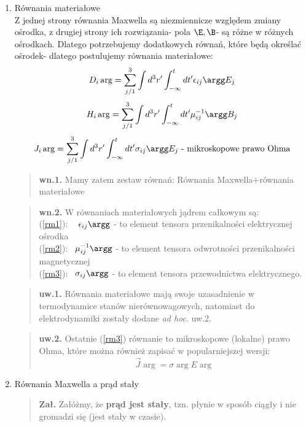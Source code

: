 \begin{enumerate}
\item{Równania materiałowe} \\
Z jednej strony równania Maxwella są niezmiennicze względem zmiany ośrodka, z drugiej strony ich rozwiązania- pola $\E,\B$- są różne w różnych ośrodkach. Dlatego potrzebujemy dodatkowych równań, które będą określać ośrodek- dlatego postulujemy równania materiałowe:
\begin{equation} {D}_i\arg=\sum_{j/1}^3\int d^3r'\int_{-\infty}^t dt' \epsilon_{ij}\argg E_j \label{rm1}\end{equation}
\begin{equation} H_i \arg =\sum_{j/1}^3\int d^3r'\int_{-\infty}^t dt' \mu^{-1}_{ij}\argg B_j \label{rm2}\end{equation}
\begin{equation} J_i \arg =\sum_{j/1}^3\int d^3r'\int_{-\infty}^t dt' \sigma_{ij}\argg E_j \label{rm3}  \text{ - mikroskopowe prawo Ohma}\end{equation}
\begin{verse}\textbf{wn.1.} Mamy zatem zestaw równań: Równania Maxwella+równania materiałowe \end{verse}
\begin{verse}\textbf{wn.2.} W równaniach materiałowych jądrem całkowym są:\\
(\ref{rm1}): ~ $\epsilon_{ij}\argg$ - to element tensora przenikalności elektrycznej ośrodka\\
(\ref{rm2}):  ~$\mu^{-1}_{ij}\argg$ - to element tensora odwrotności przenikalności magnetycznej\\
(\ref{rm3}):  ~$\sigma_{ij}\argg$  - to element tensora przewodnictwa elektrycznego. \end{verse}
\begin{verse} \textbf{uw.1.} Równania materiałowe mają swoje uzasadnienie w termodynamice stanów nierównowagowych, natomiast do elektrodynamiki zostały dodane \textsl{ad hoc}.
uw.2. \end{verse}
\begin{verse} \textbf{uw.2.} Ostatnie (\ref{rm3}) równanie to mikroskopowe (lokalne) prawo Ohma, które można również zapisać w popularniejszej wersji:
\begin{equation} \vec{J} \arg =\sigma\arg E\arg \end{equation} \end{verse}

\item{Równania Maxwella a prąd stały}\\
\begin{verse} \textbf{Zał.} Załóżmy, że \textbf{prąd jest stały}, tzn. płynie w sposób ciągły i nie gromadzi się (jest stały w czasie). \end{verse}


\end{enumerate}
